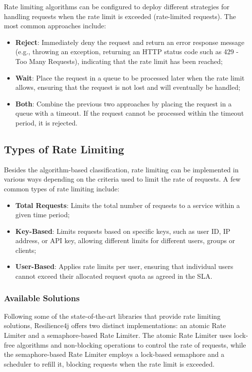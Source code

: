 Rate limiting algorithms can be configured
to deploy different strategies for handling requests when the rate limit is exceeded
(rate-limited requests).
The most common approaches include:

\begin{itemize}
    \item \textbf{Reject}: Immediately deny the request and return an error response message (e.g., throwing an exception,
    returning an HTTP status code such as 429 - Too Many Requests), indicating that the rate limit has been reached;
    \item \textbf{Wait}: Place the request in a queue to be processed later when the rate limit allows, ensuring that the request is not lost and will eventually be handled;
    \item \textbf{Both}: Combine the previous two approaches by placing the request in a queue with a timeout.
    If the request cannot be processed within the timeout period, it is rejected.
\end{itemize}

\subsection{Types of Rate Limiting}\label{subsec:rate-limiter-types}

Besides the algorithm-based classification, rate limiting can be implemented in various ways depending on the criteria used to limit the rate of requests.
A few common types of rate limiting include:
\begin{itemize}
    \item \textbf{Total Requests}: Limits the total number of requests to a service within a given time period;
    \item \textbf{Key-Based}: Limits requests based on specific keys, such as user ID, IP address, or API key,
    allowing different limits for different users, groups or clients;
    \item \textbf{User-Based}: Applies rate limits per user,
    ensuring that individual users cannot exceed their allocated request quota as agreed in the SLA.
\end{itemize}

\subsubsection{Available Solutions}\label{subsubsec:rate-limiter-solutions}

Following some of the state-of-the-art libraries that provide rate limiting solutions,
Resilience4j offers two distinct implementations: an atomic Rate Limiter and a semaphore-based Rate Limiter.
The atomic Rate Limiter uses lock-free algorithms and non-blocking operations to control the rate of requests,
while the semaphore-based Rate Limiter employs a lock-based semaphore and a scheduler to refill it,
blocking requests when the rate limit is exceeded.

